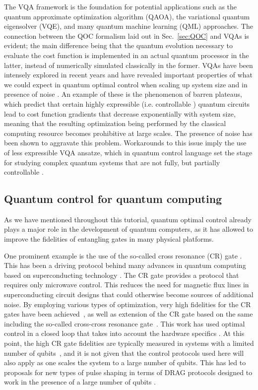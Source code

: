 The VQA framework is the foundation for potential applications such as the quantum approximate optimization algorithm (QAOA), the variational quantum eigensolver (VQE), and many quantum machine learning (QML) approaches. The connection between the QOC formalism laid out in Sec.~\ref{sec:QOC} and VQAs is evident; the main difference being that the quantum evolution necessary to evaluate the cost function is implemented in an actual quantum processor in the latter, instead of numerically simulated classically in the former. VQAs have been intensely explored in recent years and have revealed important properties of what we could expect in quantum optimal control when scaling up system size and in  presence of noise \cite{magann2021,larocca2022}. An example of these is the phenomenon of barren plateaus, which predict that certain highly expressible (i.e. controllable \cite{dalessandro_book}) quantum circuits lead to cost function gradients that decrease exponentially with system size, meaning that the resulting optimization being performed by the classical computing resource becomes prohibitive at large scales. The presence of noise has been shown to aggravate this problem. Workarounds to this issue imply the use of less expressible VQA ansatze, which in quantum control language set the stage for studying complex quantum systems that are not fully, but partially controllable \cite{ragone2024}. 

\subsection{Quantum control for quantum computing} \label{outlook_sec_qc}

As we have mentioned throughout this tutorial, quantum optimal control already plays a major role in the development of quantum computers, as it has allowed to improve the fidelities of entangling gates in many physical platforms. 

One prominent example is the use of the so-called cross resonance (CR) gate \cite{rigetti2010fully,groszkowski2011tunable}. This has been a driving protocol behind many  advances in quantum computing based on superconducting technology \cite{sheldon2016procedure}. The CR gate provides a protocol that requires only microwave control. This reduces the need for magnetic flux lines in superconducting circuit designs that could otherwise become sources of additional noise. By employing various types of optimization, very high fidelities for the CR gates have been achieved~\cite{kandala2021demonstration,wei2022hamiltonian}, as well as extension of the CR gate based on the same including the so-called cross-cross resonance gate~\cite{heya2021cross}. This work has used optimal control in a closed loop that takes into account the hardware specifics \cite{werninghaus2021}. At this point, the high CR gate fidelities are typically measured in systems with a limited number of qubits~\cite{malekakhlagh2022mitigating}, and it is not given that the control protocols used here will also apply as one scales the system to a large number of qubits. This has led to proposals for new types of pulse shaping in terms of DRAG protocols designed to work in the presence of a large number of qubits \cite{li2024experimental}. 

